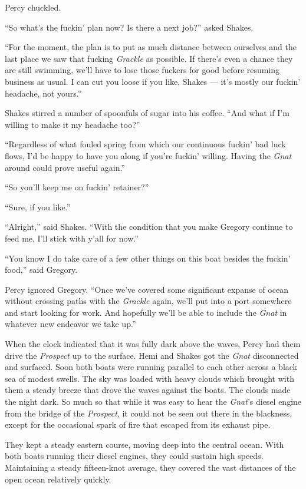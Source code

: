 \documentclass[
]{scrbook}
\begin{document}
Percy chuckled.

``So what's the fuckin' plan now? Is there a next job?'' asked Shakes.

``For the moment, the plan is to put as much distance between ourselves
and the last place we saw that fucking \emph{Grackle} as possible. If
there's even a chance they are still swimming, we'll have to lose those
fuckers for good before resuming business as usual. I can cut you loose
if you like, Shakes --- it's mostly our fuckin' headache, not yours.''

Shakes stirred a number of spoonfuls of sugar into his coffee. ``And
what if I'm willing to make it my headache too?''

``Regardless of what fouled spring from which our continuous fuckin' bad
luck flows, I'd be happy to have you along if you're fuckin' willing.
Having the \emph{Gnat} around could prove useful again.''

``So you'll keep me on fuckin' retainer?''

``Sure, if you like.''

``Alright,'' said Shakes. ``With the condition that you make Gregory
continue to feed me, I'll stick with y'all for now.''

``You know I do take care of a few other things on this boat besides the
fuckin' food,'' said Gregory.

Percy ignored Gregory. ``Once we've covered some significant expanse of
ocean without crossing paths with the \emph{Grackle} again, we'll put
into a port somewhere and start looking for work. And hopefully we'll be
able to include the \emph{Gnat} in whatever new endeavor we take up.''

\bigskip

When the clock indicated that it was fully dark above the waves, Percy
had them drive the \emph{Prospect} up to the surface. Hemi and Shakes
got the \emph{Gnat} disconnected and surfaced. Soon both boats were
running parallel to each other across a black sea of modest swells. The
sky was loaded with heavy clouds which brought with them a steady breeze
that drove the waves against the boats. The clouds made the night dark.
So much so that while it was easy to hear the \emph{Gnat}'s diesel
engine from the bridge of the \emph{Prospect}, it could not be seen out
there in the blackness, except for the occasional spark of fire that
escaped from its exhaust pipe.

They kept a steady eastern course, moving deep into the central ocean.
With both boats running their diesel engines, they could sustain high
speeds. Maintaining a steady fifteen-knot average, they covered the vast
distances of the open ocean relatively quickly.
\end{document}
